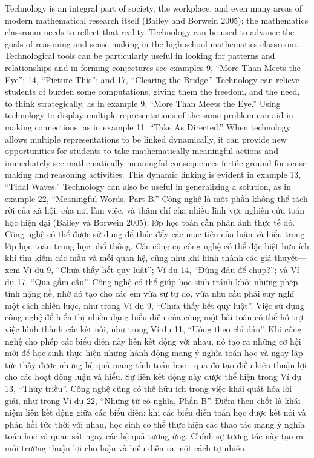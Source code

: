 \documentclass[
  10pt,
  a4paper,
  landscape,
  twoside,
  openany
]{scrbook}
\newcommand{\EN}[1]{#1}
\newcommand{\VI}[1]{#1}
\newcommand{\NOTE}[1]{#1}
\newcounter{example}
\begin{document}
\TriPara
{
\EN{Technology is an integral part of society, the workplace, and even many areas of modern mathematical research itself (Bailey and Borwein 2005); the mathematics classroom needs to reflect that reality. Technology can be used to advance the goals of reasoning and sense making in the high school mathematics classroom. Technological tools can be particularly useful in looking for patterns and relationships and in forming conjectures-see examples 9, ``More Than Meets the Eye''; 14, ``Picture This''; and 17, ``Clearing the Bridge.'' Technology can relieve students of burden some computations, giving them the freedom, and the need, to think strategically, as in example 9, ``More Than Meets the Eye.'' Using technology to display multiple representations of the same problem can aid in making connections, as in example 11, ``Take As Directed.'' When technology allows multiple representations to be linked dynamically, it can provide new opportunities for students to take mathematically meaningful actions and immediately see mathematically meaningful consequences-fertile ground for sense-making and reasoning activities. This dynamic linking is evident in example 13, “Tidal Waves.” Technology can also be useful in generalizing a solution, as in example 22, ``Meaningful Words, Part B.''}
}
{
\VI{Công nghệ là một phần không thể tách rời của xã hội, của nơi làm việc, và thậm chí của nhiều lĩnh vực nghiên cứu toán học hiện đại (Bailey và Borwein 2005); lớp học toán cần phản ánh thực tế đó. Công nghệ có thể được sử dụng để thúc đẩy các mục tiêu của luận và hiểu trong lớp học toán trung học phổ thông. Các công cụ công nghệ có thể đặc biệt hữu ích khi tìm kiếm các mẫu và mối quan hệ, cũng như khi hình thành các giả thuyết---xem Ví dụ 9, ``Chưa thấy hết quy luật''; Ví dụ 14, ``Đứng đâu để chụp?''; và Ví dụ 17, ``Qua gầm cầu''. Công nghệ có thể giúp học sinh tránh khỏi những phép tính nặng nề, nhờ đó tạo cho các em vừa sự tự do, vừa nhu cầu phải suy nghĩ một cách chiến lược, như trong Ví dụ 9, ``Chưa thấy hết quy luật''. Việc sử dụng công nghệ để hiển thị nhiều dạng biểu diễn của cùng một bài toán có thể hỗ trợ việc hình thành các kết nối, như trong Ví dụ 11, ``Uống theo chỉ dẫn''. Khi công nghệ cho phép các biểu diễn này liên kết động với nhau, nó tạo ra những cơ hội mới để học sinh thực hiện những hành động mang ý nghĩa toán học và ngay lập tức thấy được những hệ quả mang tính toán học---qua đó tạo điều kiện thuận lợi cho các hoạt động luận và hiểu. Sự liên kết động này được thể hiện trong Ví dụ 13, ``Thủy triều''. Công nghệ cũng có thể hữu ích trong việc khái quát hóa lời giải, như trong Ví dụ 22, ``Những từ có nghĩa, Phần B''.}
}
{
\NOTE{Điểm then chốt là khái niệm liên kết động giữa các biểu diễn: khi các biểu diễn toán học được kết nối và phản hồi tức thời với nhau, học sinh có thể thực hiện các thao tác mang ý nghĩa toán học và quan sát ngay các hệ quả tương ứng. Chính sự tương tác này tạo ra môi trường thuận lợi cho luận và hiểu diễn ra một cách tự nhiên.}
}
\end{document}
